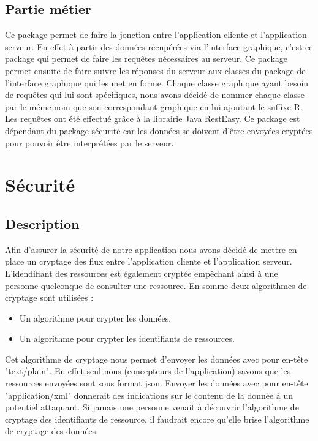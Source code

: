 \subsection{Partie métier}
Ce package permet de faire la jonction entre l'application cliente et l'application serveur. 
En effet à partir des données récupérées via l'interface graphique, c'est ce package qui permet de faire les requêtes nécessaires au serveur. Ce package permet ensuite de faire suivre les réponses du serveur aux classes du package de l'interface graphique qui les met en forme.
Chaque classe graphique ayant besoin de requêtes qui lui sont spécifiques, nous avons décidé de nommer chaque classe par le même nom que son correspondant graphique en lui ajoutant le suffixe R. \\
Les requêtes ont été effectué grâce à la librairie Java RestEasy.
Ce package est dépendant du package sécurité car les données se doivent d'être envoyées cryptées pour pouvoir être interprétées par le serveur.\\


\newpage
\section{Sécurité}

\subsection{Description}
Afin d'assurer la sécurité de notre application nous avons décidé de mettre en place un cryptage des flux entre l'application cliente et l'application serveur.
L'idendifiant des ressources est également cryptée empêchant ainsi à une personne quelconque de consulter une ressource.
En somme deux algorithmes de cryptage sont utilisées : 
\begin{itemize}
\item Un algorithme pour crypter les données.
\item Un algorithme pour crypter les identifiants de ressources.
\end{itemize}
Cet algorithme de cryptage nous permet d'envoyer les données avec pour en-tête "text/plain". 
En effet seul nous (concepteurs de l'application) savons que les ressources envoyées sont sous format json. Envoyer les données avec pour en-tête "application/xml" donnerait des indications sur le contenu de la donnée à un potentiel attaquant.
Si jamais une personne venait à découvrir l'algorithme de cryptage des identifiants de ressource, il faudrait encore qu'elle brise l'algorithme de cryptage des données.


